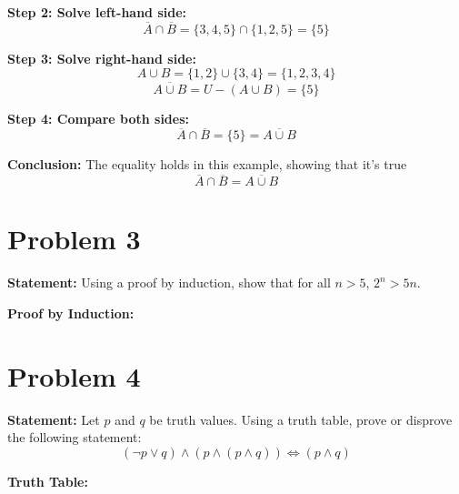 \documentclass{article}
\begin{document}
\textbf{Step 2: Solve left-hand side:}  
\[
\overline{A} \cap \overline{B} = \{3,4,5\} \cap \{1,2,5\} = \{5\}
\]

\textbf{Step 3: Solve right-hand side:}  
\[
A \cup B = \{1,2\} \cup \{3,4\} = \{1,2,3,4\}
\]  
\[
\overline{A \cup B} = U - (A \cup B) = \{5\}
\]

\textbf{Step 4: Compare both sides:}  
\[
\overline{A} \cap \overline{B} = \{5\} = \overline{A \cup B}
\]

\textbf{Conclusion:} The equality holds in this example, showing that it's true
\[
\overline{A} \cap \overline{B} = \overline{A \cup B}
\] 

\section*{Problem 3}

\textbf{Statement:} Using a proof by induction, show that for all $n > 5$, $2^n > 5n$.

\textbf{Proof by Induction:}

\section*{Problem 4}

\textbf{Statement:} Let $p$ and $q$ be truth values. Using a truth table, prove or disprove the following statement:
$$(\neg p \vee q) \wedge (p \wedge (p \wedge q)) \Leftrightarrow (p \wedge q)$$

\textbf{Truth Table:}
\end{document}
